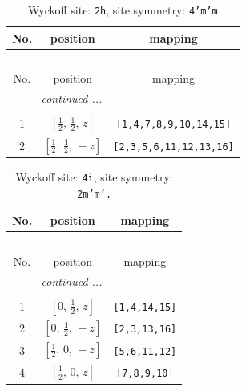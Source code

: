 \documentclass[fleqn,8pt]{jsarticle}
\begin{document}
\begin{longtable}{ccc}
\caption{Wyckoff site: {\tt 2h}, site symmetry: {\tt 4'm'm}}
 \\
 \hline \hline
No. & position & mapping \\ \hline \endfirsthead

\multicolumn{2}{l}{\tablename\ \thetable{}} \\
 \hline \hline
No. & position & mapping \\ \hline \endhead

 \hline \hline
\multicolumn{2}{r}{\footnotesize\it continued ...} \\ \endfoot

 \hline \hline
\multicolumn{2}{r}{} \\ \endlastfoot

1 & $\left[ \frac{1}{2},\, \frac{1}{2},\, z \right]$ & {\tt [1,4,7,8,9,10,14,15]} \\ \hline
2 & $\left[ \frac{1}{2},\, \frac{1}{2},\, - z \right]$ & {\tt [2,3,5,6,11,12,13,16]} \\
\end{longtable}
\renewcommand{\arraystretch}{1.2}
\begin{longtable}{ccc}
\caption{Wyckoff site: {\tt 4i}, site symmetry: {\tt 2m'm'.}}
 \\
 \hline \hline
No. & position & mapping \\ \hline \endfirsthead

\multicolumn{2}{l}{\tablename\ \thetable{}} \\
 \hline \hline
No. & position & mapping \\ \hline \endhead

 \hline \hline
\multicolumn{2}{r}{\footnotesize\it continued ...} \\ \endfoot

 \hline \hline
\multicolumn{2}{r}{} \\ \endlastfoot

1 & $\left[ 0,\, \frac{1}{2},\, z \right]$ & {\tt [1,4,14,15]} \\ \hline
2 & $\left[ 0,\, \frac{1}{2},\, - z \right]$ & {\tt [2,3,13,16]} \\ \hline
3 & $\left[ \frac{1}{2},\, 0,\, - z \right]$ & {\tt [5,6,11,12]} \\ \hline
4 & $\left[ \frac{1}{2},\, 0,\, z \right]$ & {\tt [7,8,9,10]} \\
\end{longtable}
\renewcommand{\arraystretch}{1.2}
\end{document}
